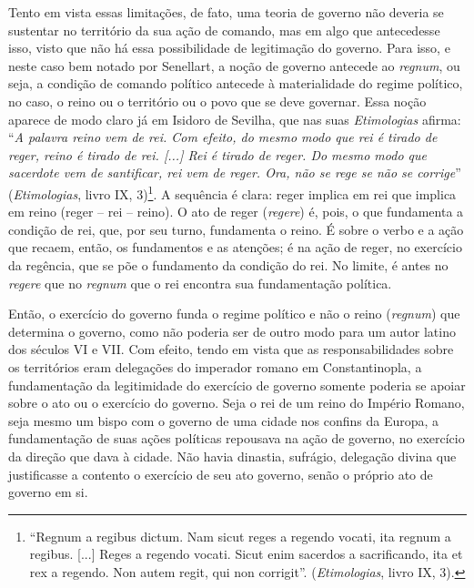 Tento em vista essas limitações, de fato, uma teoria de governo não
deveria se sustentar no território da sua ação de comando, mas em algo
que antecedesse isso, visto que não há essa possibilidade de legitimação
do governo. Para isso, e neste caso bem notado por Senellart, a noção de
governo antecede ao \emph{regnum}, ou seja, a condição de comando
político antecede à materialidade do regime político, no caso, o reino
ou o território ou o povo que se deve governar. Essa noção aparece de
modo claro já em Isidoro de Sevilha, que nas suas \emph{Etimologias}
afirma: ``\emph{A palavra reino vem de rei. Com efeito, do mesmo modo
que rei é tirado de reger, reino é tirado de rei. {[}...{]} Rei é tirado
de reger. Do mesmo modo que sacerdote vem de santificar, rei vem de
reger. Ora, não se rege se não se corrige}'' (\emph{Etimologias}, livro
IX, 3)\footnote{``Regnum a regibus dictum. Nam sicut reges a regendo
  vocati, ita regnum a regibus. {[}...{]} Reges a regendo vocati. Sicut
  enim sacerdos a sacrificando, ita et rex a regendo. Non autem regit,
  qui non corrigit''. (\emph{Etimologias}, livro IX, 3).}. A sequência é
clara: reger implica em rei que implica em reino (reger -- rei --
reino). O ato de reger (\emph{regere}) é, pois, o que fundamenta a
condição de rei, que, por seu turno, fundamenta o reino. É sobre o verbo
e a ação que recaem, então, os fundamentos e as atenções; é na ação de
reger, no exercício da regência, que se põe o fundamento da condição do
rei. No limite, é antes no \emph{regere} que no \emph{regnum} que o rei
encontra sua fundamentação política.

Então, o exercício do governo funda o regime político e não o reino
(\emph{regnum}) que determina o governo, como não poderia ser de outro
modo para um autor latino dos séculos VI e VII. Com efeito, tendo em
vista que as responsabilidades sobre os territórios eram delegações do
imperador romano em Constantinopla, a fundamentação da legitimidade do
exercício de governo somente poderia se apoiar sobre o ato ou o
exercício do governo. Seja o rei de um reino do Império Romano, seja
mesmo um bispo com o governo de uma cidade nos confins da Europa, a
fundamentação de suas ações políticas repousava na ação de governo, no
exercício da direção que dava à cidade. Não havia dinastia, sufrágio,
delegação divina que justificasse a contento o exercício de seu ato
governo, senão o próprio ato de governo em si.

